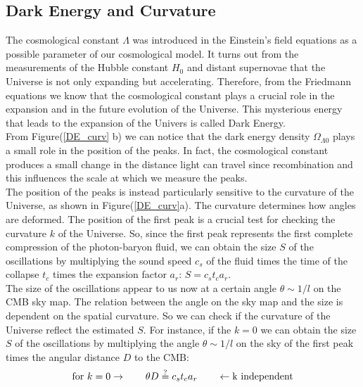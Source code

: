 \documentclass{article}
\begin{document}
\subsection{Dark Energy and Curvature}
The cosmological constant $\Lambda$ was introduced in the Einstein's field equations as a possible parameter of our cosmological model.
It turns out from the measurements of the Hubble constant $H_0$ and distant supernovae that the Universe is not only expanding but accelerating.
Therefore, from the Friedmann equations we know that the cosmological constant plays a crucial role in the expansion and in the future evolution of the Universe.
This mysterious energy that leads to the expansion of the Univers is called Dark Energy.\\
From Figure(\ref{DE_curv} b) we can notice that the dark energy density $\Omega_{\Lambda0}$ plays a small role in the position of the peaks. 
In fact, the  cosmological constant produces a small change in the distance light can travel since recombination and this influences the scale at which we measure the peaks.\\
The position of the peaks is instead particularly sensitive to the curvature of the Universe, as shown in Figure(\ref{DE_curv}a).
The curvature determines how angles are deformed.
The position of the first peak is a crucial test for checking the curvature $k$ of the Universe.
So, since the first peak represents the first complete compression of the photon-baryon fluid, we can obtain the size $S$ of the oscillations by multiplying the sound speed $c_s$ of the fluid times the time of the collapse $t_c$ times the expansion factor $a_r$: $S =c_s t_c a_r $.\\
The size of the oscillations appear to us now at a certain angle $\theta \sim 1/l$ on the CMB sky map.
The relation between the angle on the sky map and the size is dependent on the spatial curvature.
So we can check if the curvature of the Universe reflect the estimated $S$.
For instance, if the $k=0$ we can obtain the size $S$ of the oscillations by multiplying the angle $\theta \sim 1/l$ on the sky of the first peak times the angular distance $D$ to the CMB:
$$
\text{for } k=0 \rightarrow \qquad \theta D \mathrel{\stackon[1pt]{$=$}{$\scriptstyle?$}} c_s t_c a_r \qquad \leftarrow \text{k independent}
$$
\end{document}
